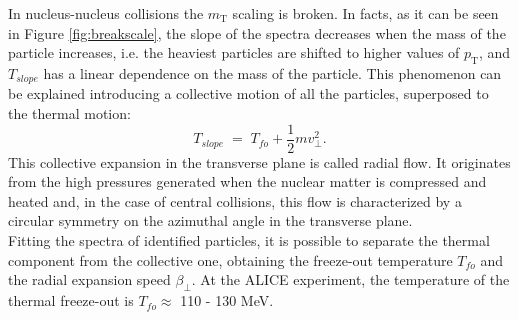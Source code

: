 %
In nucleus-nucleus collisions the $m_{\mathrm{T}}$ scaling is broken. In facts, as it can be seen in Figure \ref{fig:breakscale}, the slope of the spectra decreases when the mass of the particle increases, i.e. the heaviest particles are shifted to higher values of $p_{\mathrm{T}}$, and $T_{slope}$ has a linear dependence on the mass of the particle. This phenomenon can be explained introducing a collective motion of all the particles, superposed to the thermal motion:
\begin{equation}
 T_{slope}\;=\;T_{fo} + \frac{1}{2}mv_{\perp}^{2}.
\end{equation}
This collective expansion in the transverse plane is called radial flow. It originates from the high pressures generated when the nuclear matter is compressed and heated and, in the case of central collisions, this flow is characterized by a circular symmetry on the azimuthal angle in the transverse plane.\\
Fitting the spectra of identified particles, it is possible to separate the thermal component from the collective one, obtaining the freeze-out temperature $T_{fo}$ and the radial expansion speed $\beta_{\perp}$. At the ALICE experiment, the temperature of the thermal freeze-out is $T_{fo} \approx$ 110 - 130 MeV.
%
